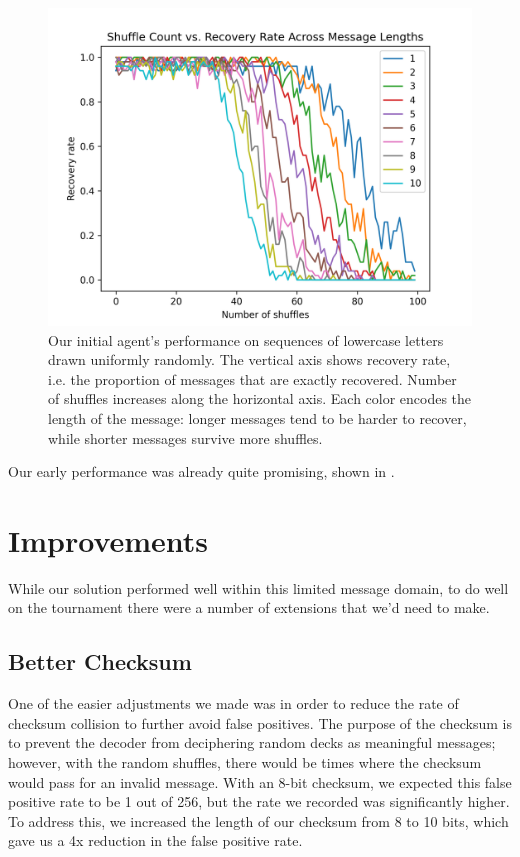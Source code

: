\documentclass[titlepage]{article}
\begin{document}
\begin{figure}
    \centering
    \includegraphics[width=\textwidth]{figures/early_agent.png}
    \caption{Our initial agent's performance on sequences of lowercase letters drawn uniformly randomly. The vertical axis shows recovery rate, i.e. the proportion of messages that are exactly recovered. Number of shuffles increases along the horizontal axis. Each color encodes the length of the message: longer messages tend to be harder to recover, while shorter messages survive more shuffles.}
    \label{fig:early_agent}
\end{figure}

Our early performance was already quite promising, shown in .

\FloatBarrier

\section{Improvements}

While our solution performed well within this limited message domain, to do well on the tournament there were a number of extensions that we'd need to make. 

\subsection{Better Checksum}
One of the easier adjustments we made was in order to reduce the rate of checksum collision to further avoid false positives. The purpose of the checksum is to prevent the decoder from deciphering random decks as meaningful messages; however, with the random shuffles, there would be times where the checksum would pass for an invalid message. With an 8-bit checksum, we expected this false positive rate to be 1 out of 256, but the rate we recorded was significantly higher. To address this, we increased the length of our checksum from 8 to 10 bits, which gave us a 4x reduction in the false positive rate.
\end{document}
